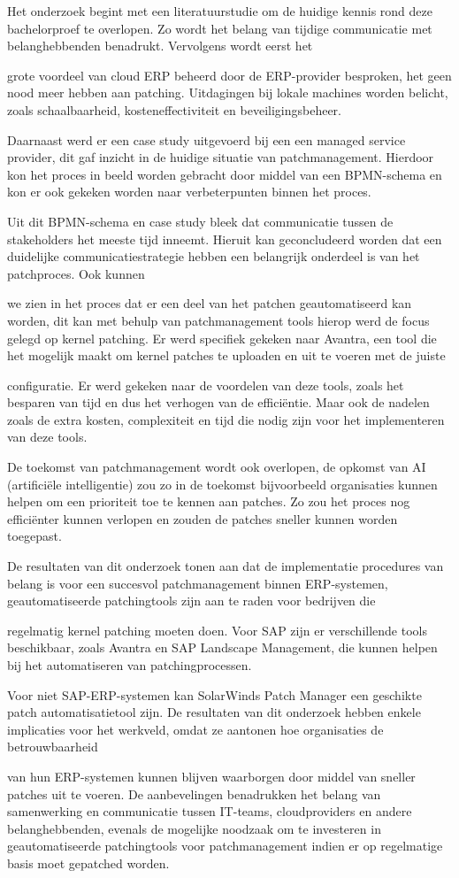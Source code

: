 Het onderzoek begint met een literatuurstudie om de huidige kennis rond deze bachelorproef te overlopen. Zo wordt het belang van tijdige communicatie met belanghebbenden benadrukt. Vervolgens wordt eerst het

grote voordeel van cloud ERP beheerd door de ERP-provider besproken, het geen nood meer hebben aan patching. Uitdagingen bij lokale machines worden belicht, zoals schaalbaarheid, kosteneffectiviteit en beveiligingsbeheer.

Daarnaast werd er een case study uitgevoerd bij een een managed service provider, dit gaf inzicht in de huidige situatie van patchmanagement. Hierdoor kon het proces in beeld worden gebracht door middel van een BPMN-schema en kon er ook gekeken worden naar verbeterpunten binnen het proces.

Uit dit BPMN-schema en case study bleek dat communicatie tussen de stakeholders het meeste tijd inneemt. Hieruit kan geconcludeerd worden dat een duidelijke communicatiestrategie hebben een belangrijk onderdeel is van het patchproces. Ook kunnen

we zien in het proces dat er een deel van het patchen geautomatiseerd kan worden, dit kan met behulp van patchmanagement tools hierop werd de focus gelegd op kernel patching. Er werd specifiek gekeken naar Avantra, een tool die het mogelijk maakt om kernel patches te uploaden en uit te voeren met de juiste

configuratie. Er werd gekeken naar de voordelen van deze tools, zoals het besparen van tijd en dus het verhogen van de efficiëntie. Maar ook de nadelen zoals de extra kosten, complexiteit en tijd die nodig zijn voor het implementeren van deze tools.

De toekomst van patchmanagement wordt ook overlopen, de opkomst van AI (artificiële intelligentie) zou zo in de toekomst bijvoorbeeld organisaties kunnen helpen om een prioriteit toe te kennen aan patches. Zo zou het proces nog efficiënter kunnen verlopen en zouden de patches sneller kunnen worden toegepast.

De resultaten van dit onderzoek tonen aan dat de implementatie procedures van belang is voor een succesvol patchmanagement binnen ERP-systemen, geautomatiseerde patchingtools zijn aan te raden voor bedrijven die

regelmatig kernel patching moeten doen. Voor SAP zijn er verschillende tools beschikbaar, zoals Avantra en SAP Landscape Management, die kunnen helpen bij het automatiseren van patchingprocessen. 

Voor niet SAP-ERP-systemen kan SolarWinds Patch Manager een geschikte patch automatisatietool zijn. De resultaten van dit onderzoek hebben enkele implicaties voor het werkveld, omdat ze aantonen hoe organisaties de betrouwbaarheid

van hun ERP-systemen kunnen blijven waarborgen door middel van sneller patches uit te voeren. De aanbevelingen benadrukken het belang van samenwerking en communicatie tussen IT-teams, cloudproviders en andere belanghebbenden, evenals de mogelijke noodzaak om te investeren in geautomatiseerde patchingtools voor patchmanagement indien er op regelmatige basis moet gepatched worden.